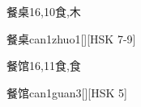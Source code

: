 \begin{Entry}{餐桌}{16,10}{⾷,⽊}
  \begin{Phonetics}{餐桌}{can1zhuo1}[][HSK 7-9]
  \end{Phonetics}
\end{Entry}

\begin{Entry}{餐馆}{16,11}{⾷,⾷}
  \begin{Phonetics}{餐馆}{can1guan3}[][HSK 5]
  \end{Phonetics}
\end{Entry}


